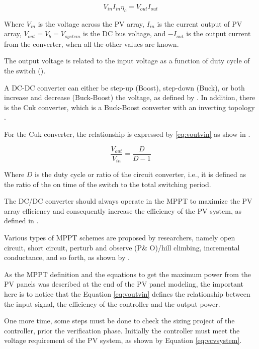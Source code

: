\begin{equation}
\label{eq:potcont}
V_{in} I_{in} \eta_{c} = V_{out} I_{out}
\end{equation}

Where $ V_{in} $ is the voltage across the PV array, $ I_{in} $ is the current output of PV array, $ V_{out}=V_{b}=V_{system} $ is the  DC bus voltage, and $-I_{out}$ is the output current from the converter, when all the other values are known.

The output voltage is related to the input voltage as a function of duty cycle of the switch (\cite{Abdulateef}). 
 
A DC-DC converter can either be step-up (Boost), step-down (Buck), or both increase and decrease (Buck-Boost) the voltage, as defined by \cite{Mahanta}. In addition, there is the Cuk converter, which is a Buck-Boost converter with an inverting topology \cite{Catherine}. 

For the Cuk converter, the relationship is expressed by \ref{eq:voutvin} as show in \cite{Abdulateef}.

\begin{equation}
\label{eq:voutvin}
\dfrac{V_{out}}{V_{in}} = \dfrac{D}{D-1}
\end{equation}

Where $D$ is the duty cycle or ratio of the circuit converter, i.e., it is defined as the ratio of the on time of the switch to the total switching period.
 
The DC/DC converter should always operate in the MPPT to maximize the PV array efficiency and consequently increase the efficiency of the PV system, as defined in \cite{Yatimi}.
  
Various types of MPPT schemes are proposed by researchers, namely open circuit, short circuit, perturb and observe (P\& O)/hill climbing, incremental conductance, and so forth, as shown by \cite{Haque}.
 
As the MPPT definition and the equations to get the maximum power from the PV panels was described at the end of the PV panel modeling, the important here is to notice that the Equation \ref{eq:voutvin} defines the relationship between the input signal, the efficiency of the controller and the output power.
 
One more time, some steps must be done to check the sizing project of the controller, prior the verification phase. Initially the controller must meet the voltage requirement of the PV system, as shown by Equation \ref{eq:vcvsystem}. 

